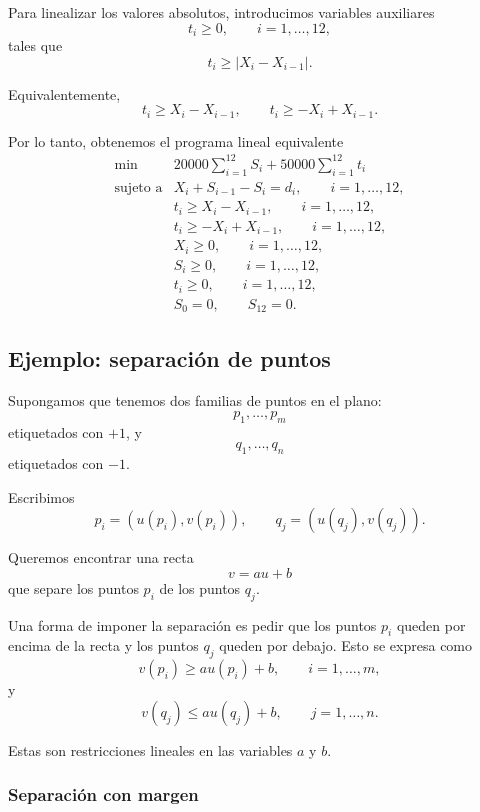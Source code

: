 Para linealizar los valores absolutos, introducimos variables auxiliares
\[
    t_i\geq 0,
    \qquad i=1,\dots,12,
\]
tales que
\[
    t_i\geq |X_i-X_{i-1}|.
\]

Equivalentemente,
\[
    t_i\geq X_i-X_{i-1},
    \qquad
    t_i\geq -X_i+X_{i-1}.
\]

Por lo tanto, obtenemos el programa lineal equivalente
\[
    \begin{array}{ll}
        \min
        &
        20000\displaystyle\sum_{i=1}^{12}S_i
        +
        50000\displaystyle\sum_{i=1}^{12}t_i
        \\[3mm]
        \text{sujeto a}
        &
        X_i+S_{i-1}-S_i=d_i,
        \qquad i=1,\dots,12,\\[1mm]
        &
        t_i\geq X_i-X_{i-1},
        \qquad i=1,\dots,12,\\[1mm]
        &
        t_i\geq -X_i+X_{i-1},
        \qquad i=1,\dots,12,\\[1mm]
        &
        X_i\geq 0,
        \qquad i=1,\dots,12,\\[1mm]
        &
        S_i\geq 0,
        \qquad i=1,\dots,12,\\[1mm]
        &
        t_i\geq 0,
        \qquad i=1,\dots,12,\\[1mm]
        &
        S_0=0,\qquad S_{12}=0.
    \end{array}
\]

\subsection{Ejemplo: separación de puntos}

Supongamos que tenemos dos familias de puntos en el plano:
\[
    p_1,\dots,p_m
\]
etiquetados con \(+1\), y
\[
    q_1,\dots,q_n
\]
etiquetados con \(-1\).

Escribimos
\[
    p_i=(u(p_i),v(p_i)),
    \qquad
    q_j=(u(q_j),v(q_j)).
\]

Queremos encontrar una recta
\[
    v=au+b
\]
que separe los puntos \(p_i\) de los puntos \(q_j\).

Una forma de imponer la separación es pedir que los puntos \(p_i\) queden por encima de la recta y los puntos \(q_j\) queden por debajo. Esto se expresa como
\[
    v(p_i)\geq au(p_i)+b,
    \qquad i=1,\dots,m,
\]
y
\[
    v(q_j)\leq au(q_j)+b,
    \qquad j=1,\dots,n.
\]

Estas son restricciones lineales en las variables \(a\) y \(b\).

\subsubsection{Separación con margen}

